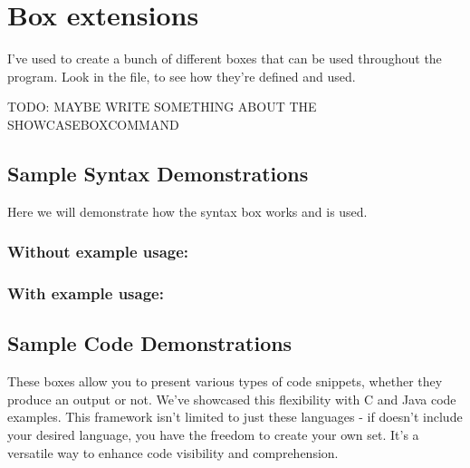 \section{Box extensions}

I've used  to create a bunch of different boxes that can be used throughout the program. Look in the  file, to see how they're defined and used.

TODO: MAYBE WRITE SOMETHING ABOUT THE SHOWCASEBOXCOMMAND

\subsection{Sample Syntax Demonstrations}
Here we will demonstrate how the syntax box works and is used. 

\subsubsection*{Without example usage:}


\subsubsection*{With example usage:}


\subsection{Sample Code Demonstrations}
These boxes allow you to present various types of code snippets, whether they produce an output or not. We've showcased this flexibility with C and Java code examples. This framework isn't limited to just these languages - if  doesn't include your desired language, you have the freedom to create your own set. It's a versatile way to enhance code visibility and comprehension.

